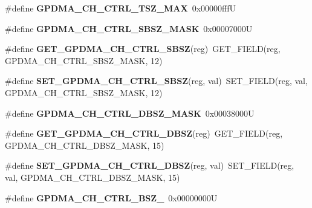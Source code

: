 \begin{DoxyCompactItemize}
\#define {\bfseries G\+P\+D\+M\+A\+\_\+\+C\+H\+\_\+\+C\+T\+R\+L\+\_\+\+T\+S\+Z\+\_\+\+M\+AX}~0x00000fffU
\item 
\mbox{\label{group__lpc24xx__regs_gacae3142c8b18bc497a2fdc9a0b316bb5}} 
\#define {\bfseries G\+P\+D\+M\+A\+\_\+\+C\+H\+\_\+\+C\+T\+R\+L\+\_\+\+S\+B\+S\+Z\+\_\+\+M\+A\+SK}~0x00007000U
\item 
\mbox{\label{group__lpc24xx__regs_gad390191468ced4210db84cd626961640}} 
\#define {\bfseries G\+E\+T\+\_\+\+G\+P\+D\+M\+A\+\_\+\+C\+H\+\_\+\+C\+T\+R\+L\+\_\+\+S\+B\+SZ}(reg)~G\+E\+T\+\_\+\+F\+I\+E\+LD(reg, G\+P\+D\+M\+A\+\_\+\+C\+H\+\_\+\+C\+T\+R\+L\+\_\+\+S\+B\+S\+Z\+\_\+\+M\+A\+SK, 12)
\item 
\mbox{\label{group__lpc24xx__regs_ga702bc6ae4e6ea8ddb2ae1cc04937b197}} 
\#define {\bfseries S\+E\+T\+\_\+\+G\+P\+D\+M\+A\+\_\+\+C\+H\+\_\+\+C\+T\+R\+L\+\_\+\+S\+B\+SZ}(reg,  val)~S\+E\+T\+\_\+\+F\+I\+E\+LD(reg, val, G\+P\+D\+M\+A\+\_\+\+C\+H\+\_\+\+C\+T\+R\+L\+\_\+\+S\+B\+S\+Z\+\_\+\+M\+A\+SK, 12)
\item 
\mbox{\label{group__lpc24xx__regs_gae147fd0d38f1485abfd088456701fce5}} 
\#define {\bfseries G\+P\+D\+M\+A\+\_\+\+C\+H\+\_\+\+C\+T\+R\+L\+\_\+\+D\+B\+S\+Z\+\_\+\+M\+A\+SK}~0x00038000U
\item 
\mbox{\label{group__lpc24xx__regs_gaa6b54514c53ed7202e62b6c83ee7aac1}} 
\#define {\bfseries G\+E\+T\+\_\+\+G\+P\+D\+M\+A\+\_\+\+C\+H\+\_\+\+C\+T\+R\+L\+\_\+\+D\+B\+SZ}(reg)~G\+E\+T\+\_\+\+F\+I\+E\+LD(reg, G\+P\+D\+M\+A\+\_\+\+C\+H\+\_\+\+C\+T\+R\+L\+\_\+\+D\+B\+S\+Z\+\_\+\+M\+A\+SK, 15)
\item 
\mbox{\label{group__lpc24xx__regs_gae4bcf1c4a7690391e7832f59cc087053}} 
\#define {\bfseries S\+E\+T\+\_\+\+G\+P\+D\+M\+A\+\_\+\+C\+H\+\_\+\+C\+T\+R\+L\+\_\+\+D\+B\+SZ}(reg,  val)~S\+E\+T\+\_\+\+F\+I\+E\+LD(reg, val, G\+P\+D\+M\+A\+\_\+\+C\+H\+\_\+\+C\+T\+R\+L\+\_\+\+D\+B\+S\+Z\+\_\+\+M\+A\+SK, 15)
\item 
\mbox{\label{group__lpc24xx__regs_gabfe5d7b1bf8b0c691b50b215c3b5214c}} 
\#define {\bfseries G\+P\+D\+M\+A\+\_\+\+C\+H\+\_\+\+C\+T\+R\+L\+\_\+\+B\+S\+Z\+\_}~0x00000000U

\end{DoxyCompactItemize}
